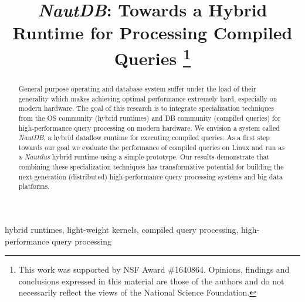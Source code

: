 \documentclass[conference]{IEEEtran}
\begin{document}
\title{\emph{NautDB}: Towards a Hybrid Runtime for Processing Compiled Queries
\thanks{This work was supported by NSF Award \#1640864. Opinions, findings and conclusions expressed in this material are those of the authors and do not necessarily reflect the views of the National Science Foundation.}
}

\author{
}

\newcommand{\todo}[1]{\textcolor{red}{#1}}

\maketitle

\begin{abstract}
General purpose operating and database system suffer under the load of their generality which makes achieving optimal performance extremely hard, especially on modern hardware.
The goal of this research is to integrate specialization techniques from the OS community (hybrid runtimes) and DB community (compiled queries) for high-performance query processing on modern hardware. We envision a system called \emph{NautDB}, a hybrid dataflow runtime for executing compiled queries. As a first step towards our goal we evaluate the performance of compiled queries on Linux and run as a \emph{Nautilus} hybrid runtime using a simple prototype.
Our results demonstrate that combining these specialization techniques has transformative potential for building the next generation (distributed) high-performance query processing systems and big data platforms.
\end{abstract}

\begin{IEEEkeywords}
hybrid runtimes, light-weight kernels, compiled query processing, high-performance query processing
\end{IEEEkeywords}
\end{document}
